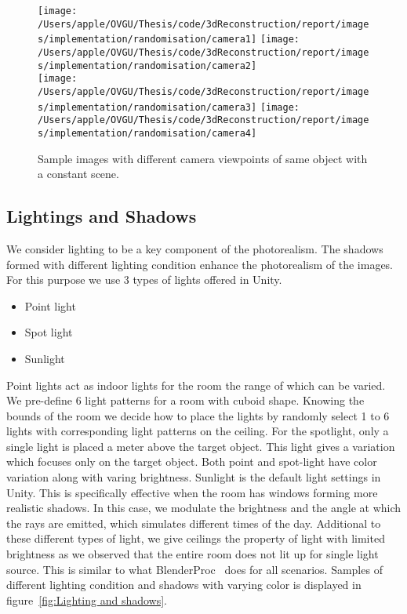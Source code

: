 \begin{figure}
    \centering
    \texttt{[image: /Users/apple/OVGU/Thesis/code/3dReconstruction/report/images/implementation/randomisation/camera1]}
    \texttt{[image: /Users/apple/OVGU/Thesis/code/3dReconstruction/report/images/implementation/randomisation/camera2]}\\
    \vspace{0.1cm}
    \texttt{[image: /Users/apple/OVGU/Thesis/code/3dReconstruction/report/images/implementation/randomisation/camera3]}
    \texttt{[image: /Users/apple/OVGU/Thesis/code/3dReconstruction/report/images/implementation/randomisation/camera4]}\\
    \caption{Sample images with different camera viewpoints of same object with a constant scene.}
    \label{fig:Camera viewpoints}
\end{figure}

\subsection{Lightings and Shadows}\label{subsec:lightings-and-shadows}

We consider lighting to be a key component of the photorealism.
The shadows formed with different lighting condition enhance the photorealism of the images.
For this purpose we use 3 types of lights offered in Unity.

\begin{itemize}
    \item Point light
    \item Spot light
    \item Sunlight
\end{itemize}

Point lights act as indoor lights for the room the range of which can be varied.
We pre-define 6 light patterns for a room with cuboid shape.
Knowing the bounds of the room we decide how to place the lights by randomly select 1 to 6 lights with corresponding light patterns on the ceiling.
For the spotlight, only a single light is placed a meter above the target object.
This light gives a variation which focuses only on the target object.
Both point and spot-light have color variation along with varing brightness.
Sunlight is the default light settings in Unity.
This is specifically effective when the room has windows forming more realistic shadows.
In this case, we modulate the brightness and the angle at which the rays are emitted, which simulates different times of the day.
Additional to these different types of light, we give ceilings the property of light with limited brightness as we observed that the entire room does not lit up for single light source.
This is similar to what BlenderProc~\cite{denninger2019blenderproc} does for all scenarios.
Samples of different lighting condition and shadows with varying color is displayed in figure~\ref{fig:Lighting and shadows}.

